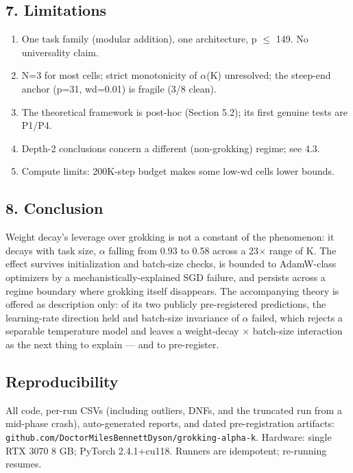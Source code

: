 \documentclass[
  11pt,
]{article}
\providecommand{\tightlist}{%
  \setlength{\itemsep}{0pt}\setlength{\parskip}{0pt}}
\begin{document}
\subsection{7. Limitations}\label{limitations}

\begin{enumerate}
\def\labelenumi{\arabic{enumi}.}
\tightlist
\item
  One task family (modular addition), one architecture, p $\leq$ 149. No
  universality claim.
\item
  N=3 for most cells; strict monotonicity of $\alpha$(K) unresolved; the
  steep-end anchor (p=31, wd=0.01) is fragile (3/8 clean).
\item
  The theoretical framework is post-hoc (Section 5.2); its first genuine
  tests are P1/P4.
\item
  Depth-2 conclusions concern a different (non-grokking) regime; see
  4.3.
\item
  Compute limits: 200K-step budget makes some low-wd cells lower bounds.
\end{enumerate}

\subsection{8. Conclusion}\label{conclusion}

Weight decay's leverage over grokking is not a constant of the
phenomenon: it decays with task size, \textbar $\alpha$\textbar{} falling from
0.93 to 0.58 across a 23$\times$ range of K. The effect survives initialization
and batch-size checks, is bounded to AdamW-class optimizers by a
mechanistically-explained SGD failure, and persists across a regime
boundary where grokking itself disappears. The accompanying theory is
offered as description only: of its two publicly pre-registered
predictions, the learning-rate direction held and batch-size invariance
of $\alpha$ failed, which rejects a separable temperature model and leaves a
weight-decay $\times$ batch-size interaction as the next thing to explain ---
and to pre-register.

\subsection{Reproducibility}\label{reproducibility}

All code, per-run CSVs (including outliers, DNFs, and the truncated run
from a mid-phase crash), auto-generated reports, and dated
pre-registration artifacts:
\texttt{github.com/DoctorMilesBennettDyson/grokking-alpha-k}. Hardware:
single RTX 3070 8 GB; PyTorch 2.4.1+cu118. Runners are idempotent;
re-running resumes.
\end{document}
